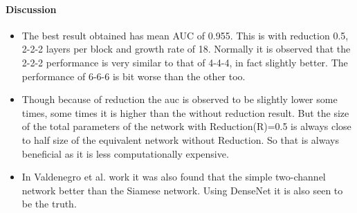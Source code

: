 
\paragraph{Discussion\\}

\begin{itemize}
 \item The best result obtained has mean AUC of 0.955. This is with reduction 0.5, 2-2-2 layers per block and growth rate of 18. Normally it is observed that the 2-2-2 performance
 is very similar to that of 4-4-4, in fact slightly better. The performance of 6-6-6 is bit worse than the other too. 
 \item Though because of reduction the auc is observed to be slightly lower some times, some times it is higher than the without reduction result. But the size of the total parameters 
 of the network with Reduction(R)=0.5 is always close to half size of the equivalent network without Reduction. So that is always beneficial as it is less computationally expensive.
 \item In Valdenegro et al. \cite{stateoftheart} work it was also found that the simple two-channel network better than the Siamese network. Using DenseNet it is also seen to be the truth.
\end{itemize}

